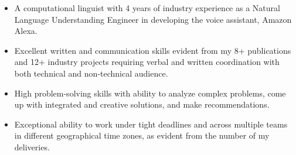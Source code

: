 \documentclass[12pt,letter,roman]{moderncv}        %
\begin{document}
 {\begin{itemize}
 
 
\item A computational linguist with 4 years of industry experience as a Natural Language Understanding Engineer in developing the voice assistant, Amazon Alexa. 

\item Excellent written and communication skills evident from my 8+ publications and 12+ industry projects requiring verbal and written coordination with both technical and non-technical audience.

 
 
\item High problem-solving skills with ability to analyze complex problems, come up with integrated and creative solutions, and make recommendations.


\item Exceptional ability to work under tight deadlines and across multiple teams in different geographical time zones, as evident from the number of my deliveries. 
    
 

  \end{itemize}
}



\vspace{-0.5em}

\end{document}
